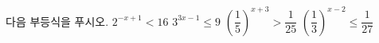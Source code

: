 다음 부등식을 푸시오.
 $2^{-x+1}<16$
 $3^{3x-1}\le 9$
 $\left(\dfrac{1}{5}\right)^{x+3}>\dfrac{1}{25}$
 $\left(\dfrac{1}{3}\right)^{x-2}\le\dfrac{1}{27}$
